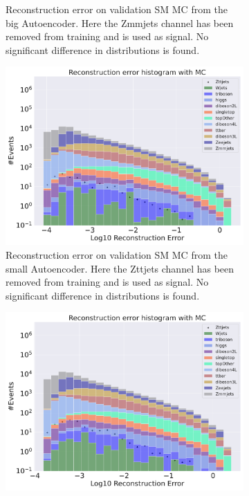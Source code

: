 \begin{figure}[H]
\begin{subfigure}{.45\textwidth}
        \caption{Reconstruction error on validation SM MC from the big Autoencoder. Here the Zmmjets channel has been removed from training and 
        is used as signal. No significant difference in distributions is found. }
        \label{fig:ae_big_Zmmjets}
    \end{subfigure}
    \hfill
    \begin{subfigure}{.45\textwidth}
        \includegraphics[width=\textwidth]{Figures/AE_testing/small/b_data_recon_big_rm3_feats_sig_Zttjets.pdf}
        \caption{Reconstruction error on validation SM MC from the small Autoencoder. Here the Zttjets channel has been removed from training and 
        is used as signal. No significant difference in distributions is found. }
        \label{fig:ae_small_Zttjets}
    \end{subfigure}
    \hfill 
    \begin{subfigure}{.45\textwidth}
        \includegraphics[width=\textwidth]{Figures/AE_testing/big/b_data_recon_big_rm3_feats_sig_Zttjets.pdf}

\end{subfigure}
\end{figure}
